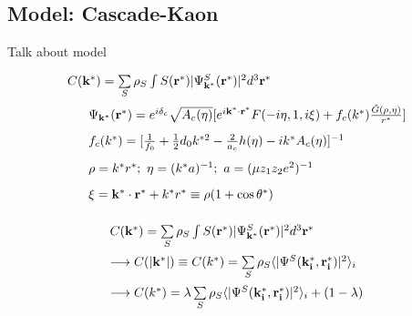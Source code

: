 \documentclass[../AnalysisNoteJBuxton.tex]{subfiles}
\begin{document}
\subsection{Model: Cascade-Kaon}
\label{ModelCascadeKaon}

Talk about model

\begin{equation}
\begin{array}{l}
\vspace{2mm}
  C(\mathbf{k^{*}}) = \sum\limits_{S}\rho_{S}\int S(\mathbf{r^{*}})|\Psi^{S}_{\mathbf{k^{*}}}(\mathbf{r^{*}})|^{2}d^{3}\mathbf{r^{*}} \\
\vspace{3mm}
  ~~~~~\Psi_{\mathbf{k^{*}}}(\mathbf{r^{*}}) = e^{i\delta_{c}}\sqrt{A_{c}(\eta)}[e^{i\mathbf{k^{*}} \cdot \mathbf{r^{*}}}F(-i\eta,1,i\xi) + f_{c}(k^{*})\frac{\tilde{G}(\rho,\eta)}{r^{*}}] \\
\vspace{3mm}
  ~~~~~f_{c}(k^{*}) = [\frac{1}{f_{0}} + \frac{1}{2}d_{0}k^{*2} - \frac{2}{a_{c}}h(\eta) - ik^{*}A_{c}(\eta)]^{-1} \\
\vspace{3mm}
  ~~~~~\rho = k^{*}r^{*};~ \eta = (k^{*}a)^{-1};~ a = (\mu z_{1}z_{2}e^{2})^{-1} \\  
\vspace{2mm}
  ~~~~~\xi = \mathbf{k^{*}} \cdot \mathbf{r^{*}} + k^{*}r^{*} \equiv \rho(1+\cos\theta^{*}) \\
\end{array}
\label{eqn:CoulombEqn}
\end{equation}


\begin{equation}
\begin{array}{l}
\vspace{2mm}
  C(\mathbf{k^{*}}) = \sum\limits_{S}\rho_{S}\int S(\mathbf{r^{*}})|\Psi^{S}_{\mathbf{k^{*}}}(\mathbf{r^{*}})|^{2}d^{3}\mathbf{r^{*}} \\
\vspace{2mm}
  \longrightarrow C(|\mathbf{k^{*}}|) \equiv C(k^{*}) = \sum\limits_{S}\rho_{S}\langle |\Psi^{S}(\mathbf{k^{*}_{i}},\mathbf{r^{*}_{i}})|^{2} \rangle_{i} \\
\vspace{2mm}
  \longrightarrow C(k^{*}) = \lambda\sum\limits_{S}\rho_{S}\langle |\Psi^{S}(\mathbf{k^{*}_{i}},\mathbf{r^{*}_{i}})|^{2} \rangle_{i} + (1-\lambda)

\end{array}
\label{eqn:CoulombEqn2}
\end{equation}
\end{document}
